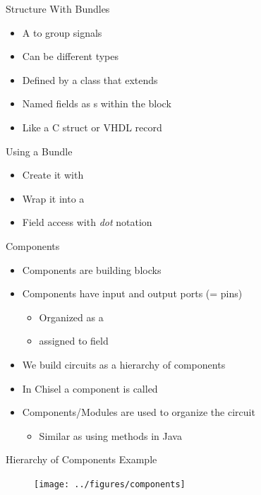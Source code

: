 \begin{frame}[fragile]{Structure With Bundles}
\begin{itemize}
\item A  to group signals
\item Can be different types
\item Defined by a class that extends 
\item Named fields as s within the block
\item Like a C struct or VHDL record
\end{itemize}
\end{frame}

\begin{frame}[fragile]{Using a Bundle}
\begin{itemize}
\item Create it with 
\item Wrap it into a 
\item Field access with \emph{dot} notation
\end{itemize}
\end{frame}



\begin{frame}[fragile]{Components}
\begin{itemize}
\item Components are building blocks
\item Components have input and output ports (= pins)
\begin{itemize}
\item Organized as a 
\item assigned to field 
\end{itemize}
\item We build circuits as a hierarchy of components
\item In Chisel a component is called 
\item Components/Modules are used to organize the circuit
\begin{itemize}
\item Similar as using methods in Java
\end{itemize}
\end{itemize}
\end{frame}

\begin{frame}[fragile]{Hierarchy of Components Example}
\begin{figure}
  \texttt{[image: ../figures/components]}
\end{figure}
\end{frame}


